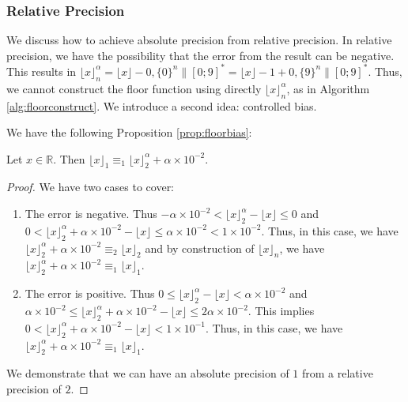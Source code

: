 \documentclass[runningheads]{llncs}
\begin{document}
\subsubsection{Relative Precision}
We discuss how to achieve absolute precision from relative precision. In relative precision, we have the possibility that the error from the result can be negative. This results in $\lfloor x \rfloor_n^\alpha = \lfloor x \rfloor - 0,\{0\}^{n}\|[0;9]^*=\lfloor x \rfloor-1 + 0,\{9\}^{n}\|[0;9]^* $. Thus, we cannot construct the floor function using directly $\lfloor x \rfloor_n^\alpha$, as in Algorithm \ref{alg:floorconstruct}. We introduce a second idea: controlled bias.

\medskip

\noindent We have the following Proposition \ref{prop:floorbias}:
\begin{proposition}\label{prop:floorbias}
  Let $x\in\mathbb{R}$. Then $\lfloor x\rfloor_1 \equiv_1 \lfloor x \rfloor_2^\alpha + \alpha\times10^{-2}$.
\end{proposition}
\begin{proof}
  We have two cases to cover: \begin{enumerate}
    \item The error is negative. Thus $-\alpha\times 10^{-2} < \lfloor x \rfloor_2^\alpha - \lfloor x \rfloor \leq 0$ and $0 < \lfloor x \rfloor_2^\alpha + \alpha\times 10^{-2} - \lfloor x \rfloor \leq \alpha\times 10^{-2} < 1\times 10^{-2}$. Thus, in this case, we have $\lfloor x \rfloor_2^\alpha + \alpha\times 10^{-2} \equiv_2 \lfloor x \rfloor_2$ and by construction of $\lfloor x \rfloor_n$, we have $\lfloor x \rfloor_2^\alpha + \alpha\times 10^{-2} \equiv_1 \lfloor x \rfloor_1$.
    \item The error is positive. Thus $0 \leq \lfloor x \rfloor_2^\alpha - \lfloor x \rfloor < \alpha\times10^{-2}$ and $\alpha\times10^{-2} \leq \lfloor x \rfloor_2^\alpha + \alpha\times 10^{-2} - \lfloor x \rfloor \leq 2\alpha\times 10^{-2}$. This implies $0<\lfloor x \rfloor_2^\alpha + \alpha\times 10^{-2} - \lfloor x \rfloor<1\times10^{-1}$. Thus, in this case, we have $\lfloor x \rfloor_2^\alpha + \alpha\times 10^{-2} \equiv_1 \lfloor x \rfloor_1$.
  \end{enumerate}
  We demonstrate that we can have an absolute precision of $1$ from a relative precision of $2$.
\end{proof}
\end{document}
